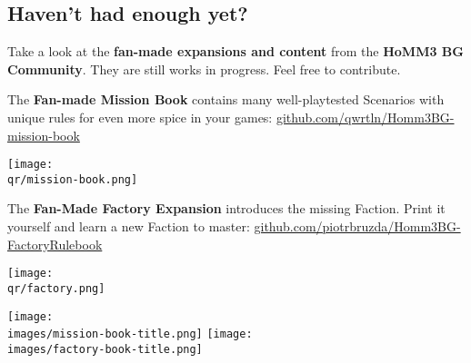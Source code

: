 \begin{multicols}{2}
\subsection*{Haven't had enough yet?}
Take a look at the \textbf{fan-made expansions and content} from the \textbf{HoMM3 BG Community}.
They are still works in progress.
Feel free to contribute.
  \begin{itemize}
    \begin{minipage}{5cm}
      \item The \textbf{Fan-made Mission Book} contains many well-playtested Scenarios with unique rules for even more spice in your games:
      \mbox{\footnotesize \href{https://github.com/qwrtln/Homm3BG-mission-book}{github.com/qwrtln/Homm3BG-mission-book}}
    \end{minipage}
    \hfill
    \begin{minipage}{2cm}
        \begin{center}
            \texttt{[image: \\qr/mission-book.png]}
            \scriptsize {}
        \end{center}
    \end{minipage}\par
    \smallskip
    \begin{minipage}{5cm}
      \item The \textbf{Fan-Made Factory Expansion} introduces the missing Faction.
      Print it yourself and learn a new Faction to master:
      {\footnotesize \href{https://github.com/piotrbruzda/Homm3BG-FactoryRulebook}{github.com/piotrbruzda/Homm3BG-FactoryRulebook}}
    \end{minipage}
    \hfill
    \begin{minipage}{2cm}
        \begin{center}
            \vspace*{-1em}
            \texttt{[image: \\qr/factory.png]}
            \scriptsize {}
        \end{center}
    \end{minipage}\par
    \smallskip
  \end{itemize}
  \begin{center}
    \hfill
    \texttt{[image: \\images/mission-book-title.png]}
    \texttt{[image: \\images/factory-book-title.png]}
  \end{center}
  \begin{itemize}

\end{itemize}
\end{multicols}
